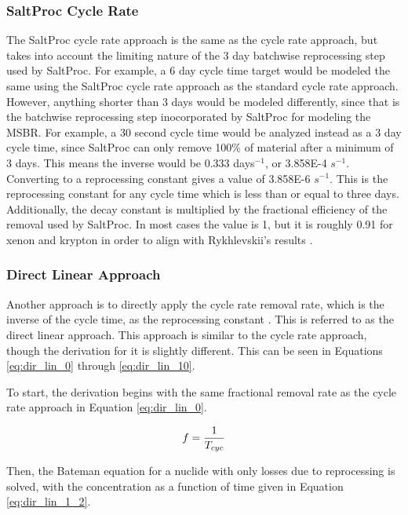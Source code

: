 \subsubsection{SaltProc Cycle Rate}

The SaltProc cycle rate approach is the same as the cycle rate approach, but takes into account the limiting nature of the 3 day batchwise reprocessing step used by SaltProc. For example, a 6 day cycle time target would be modeled the same using the SaltProc cycle rate approach as the standard cycle rate approach. However, anything shorter than 3 days would be modeled differently, since that is the batchwise reprocessing step inocorporated by SaltProc for modeling the MSBR. For example, a 30 second cycle time would be analyzed instead as a 3 day cycle time, since SaltProc can only remove 100\% of material after a minimum of 3 days. This means the inverse would be 0.333 days$^{-1}$, or 3.858E-4 $s^{-1}$. Converting to a reprocessing constant gives a value of 3.858E-6 $s^{-1}$. This is the reprocessing constant for any cycle time which is less than or equal to three days. Additionally, the decay constant is multiplied by the fractional efficiency of the removal used by SaltProc. In most cases the value is 1, but it is roughly 0.91 for xenon and krypton in order to align with Rykhlevskii's results \cite{rykhlevskii_fuel_2020}.

\subsubsection{Direct Linear Approach}
\label{s:DL}

Another approach is to directly apply the cycle rate removal rate, which is the inverse of the cycle time, as the reprocessing constant \cite{hombourger_eql0d_2020}. This is referred to as the direct linear approach. This approach is similar to the cycle rate approach, though the derivation for it is slightly different. This can be seen in Equations \eqref{eq:dir_lin_0} through \eqref{eq:dir_lin_10}.%

To start, the derivation begins with the same fractional removal rate as the cycle rate approach in Equation \eqref{eq:dir_lin_0}.

\begin{equation} \hfill
f = \frac{1}{T_{cyc}}
\hfill\label{eq:dir_lin_0} \end{equation}

Then, the Bateman equation for a nuclide with only losses due to reprocessing is solved, with the concentration as a function of time given in Equation \eqref{eq:dir_lin_1_2}.

